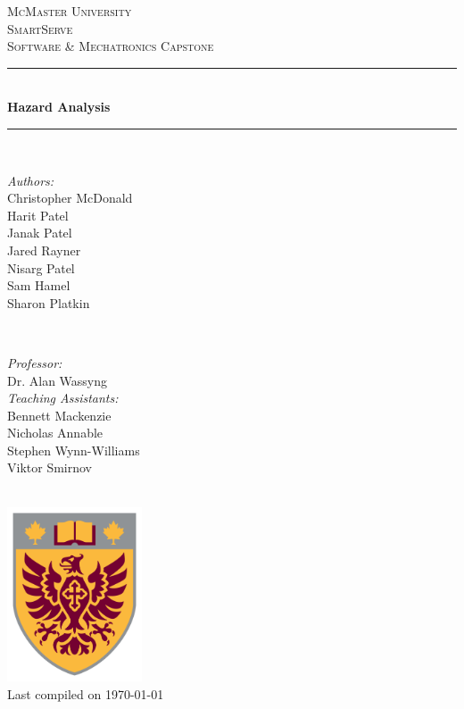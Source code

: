 \documentclass[11pt]{article}
\begin{document}
\begin{titlepage}
	\newcommand{\HRule}{\rule{\linewidth}{0.2mm}}
	\begin{center}
	\textsc{\LARGE McMaster University}\\[1.5cm]

	\textsc{\Large SmartServe}\\[0.5cm]
	\textsc{\large Software \& Mechatronics Capstone}\\[0.5cm]

	\HRule\\[0.4cm]
		{\huge\bfseries Hazard Analysis}\\[0.4cm]
	\HRule\\[0.4cm]

	\begin{minipage}[t][][t]{0.5\textwidth}
		\begin{flushleft} \large
			\emph{Authors:}\\
			Christopher McDonald\\
			Harit Patel \\
			Janak Patel \\
			Jared Rayner  \\
			Nisarg Patel  \\
			Sam Hamel \\
			Sharon Platkin \\
		\end{flushleft}
	\end{minipage}
	~
	\begin{minipage}[t][][t]{0.4\textwidth}
		\begin{flushright} \large
			\emph{Professor:} \\
			Dr. Alan Wassyng \\[0.4cm]
			\emph{Teaching Assistants:} \\
			Bennett Mackenzie \\
			Nicholas Annable \\
			Stephen Wynn-Williams \\
			Viktor Smirnov
		\end{flushright}
	\end{minipage}\\[2cm]

	\includegraphics[width=0.3\textwidth]{logo.png} \\
	{\large Last compiled on \today}
	\end{center}

\end{titlepage}
\end{document}
